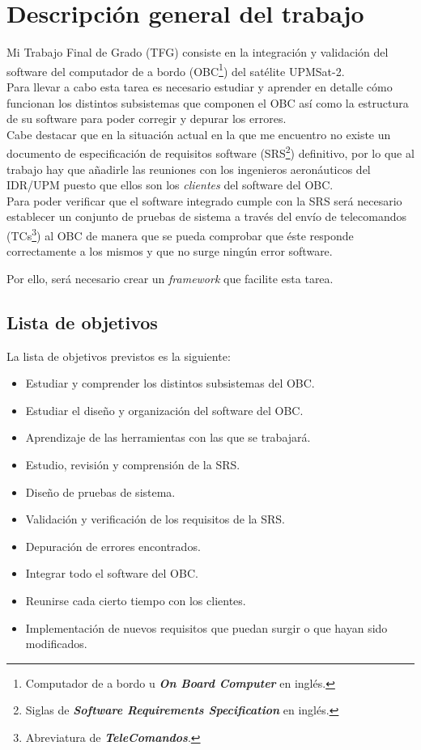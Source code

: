 
\section{Descripción general del trabajo}
Mi Trabajo Final de Grado (TFG) consiste en la integración y validación del
software del computador de a bordo (OBC\footnote{Computador de a bordo u
  \textbf{\textit{On Board Computer}} en inglés.}) del satélite UPMSat-2.\\

  Para llevar a cabo esta tarea es necesario estudiar y aprender en detalle cómo
  funcionan los distintos subsistemas que componen el OBC así como la estructura
  de su software para poder corregir y depurar los errores.\\

  Cabe destacar que en la situación actual en la que me encuentro no existe un
  documento de especificación de requisitos software (SRS\footnote{Siglas de
    \textbf{\textit{Software Requirements Specification}} en inglés.}) definitivo, por lo
  que al trabajo hay que añadirle las reuniones con los ingenieros aeronáuticos
  del IDR/UPM puesto que ellos son los \textit{clientes} del software del OBC.\\

  Para poder verificar que el software integrado cumple con la SRS será
  necesario establecer un conjunto de pruebas de sistema a través del envío
  de telecomandos (TCs\footnote{Abreviatura de \textbf{\textit{TeleComandos}}.}) al OBC de manera que se pueda comprobar que éste
  responde correctamente a los mismos y que no surge ningún error software.

  Por ello, será necesario crear un \textit{framework} que facilite esta tarea.\\

  \subsection{Lista de objetivos}
  La lista de objetivos previstos es la siguiente:
  \begin{itemize}
  \item Estudiar y comprender los distintos subsistemas del OBC.
  \item Estudiar el diseño y organización del software del OBC.
  \item Aprendizaje de las herramientas con las que se trabajará.
  \item Estudio, revisión y comprensión de la SRS.
  \item Diseño de pruebas de sistema.
  \item Validación y verificación de los requisitos de la SRS.
  \item Depuración de errores encontrados.
  \item Integrar todo el software del OBC.
  \item Reunirse cada cierto tiempo con los clientes.
  \item Implementación de nuevos requisitos que puedan surgir o que hayan sido
    modificados.
  \end{itemize}